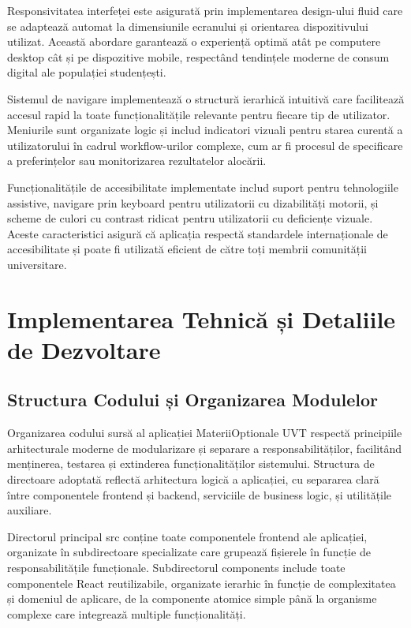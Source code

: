\documentclass[12pt,a4paper]{report}
\begin{document}
Responsivitatea interfeței este asigurată prin implementarea design-ului fluid care se adaptează automat la dimensiunile ecranului și orientarea dispozitivului utilizat. Această abordare garantează o experiență optimă atât pe computere desktop cât și pe dispozitive mobile, respectând tendințele moderne de consum digital ale populației studențești.

Sistemul de navigare implementează o structură ierarhică intuitivă care facilitează accesul rapid la toate funcționalitățile relevante pentru fiecare tip de utilizator. Meniurile sunt organizate logic și includ indicatori vizuali pentru starea curentă a utilizatorului în cadrul workflow-urilor complexe, cum ar fi procesul de specificare a preferințelor sau monitorizarea rezultatelor alocării.

Funcționalitățile de accesibilitate implementate includ suport pentru tehnologiile assistive, navigare prin keyboard pentru utilizatorii cu dizabilități motorii, și scheme de culori cu contrast ridicat pentru utilizatorii cu deficiențe vizuale. Aceste caracteristici asigură că aplicația respectă standardele internaționale de accesibilitate și poate fi utilizată eficient de către toți membrii comunității universitare.

\chapter{Implementarea Tehnică și Detaliile de Dezvoltare}

\section{Structura Codului și Organizarea Modulelor}

Organizarea codului sursă al aplicației MateriiOptionale UVT respectă principiile arhitecturale moderne de modularizare și separare a responsabilităților, facilitând menținerea, testarea și extinderea funcționalităților sistemului. Structura de directoare adoptată reflectă arhitectura logică a aplicației, cu separarea clară între componentele frontend și backend, serviciile de business logic, și utilitățile auxiliare.

Directorul principal src conține toate componentele frontend ale aplicației, organizate în subdirectoare specializate care grupează fișierele în funcție de responsabilitățile funcționale. Subdirectorul components include toate componentele React reutilizabile, organizate ierarhic în funcție de complexitatea și domeniul de aplicare, de la componente atomice simple până la organisme complexe care integrează multiple funcționalități.
\end{document}
